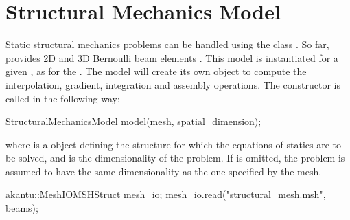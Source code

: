 \chapter{Structural  Mechanics   Model}
Static structural mechanics problems can be handled using the
class .  So far, \akantu provides 2D and 3D
Bernoulli beam elements \cite{frey2009}.  This model is instantiated for a given
, as for the .  The model will create its own  object to
compute the interpolation, gradient, integration and assembly
operations.  The  constructor is called
in the following way:

\begin{cpp}
  StructuralMechanicsModel model(mesh, spatial_dimension);
\end{cpp}
where  is a  object defining the structure for
which the equations of statics are to be solved, and
 is the dimensionality of the problem.  If
 is omitted, the problem is assumed to have
the same dimensionality as the one specified by the mesh.


\begin{cpp}
	akantu::MeshIOMSHStruct mesh_io;
	mesh_io.read("structural_mesh.msh", beams);
\end{cpp}

